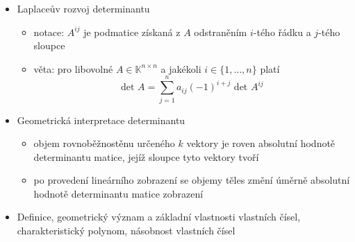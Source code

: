 \begin{itemize}
\begin{itemize}
\item determinant matice $A\in\mathbb K^{n\times n}$ je dán výrazem \[\text{det }A=\sum_{p\in S_n}\text{sgn}(p)\prod_{i=1}^na_{i,p(i)}\]
\item věta: $\forall A,B\in\mathbb K^{n\times n}:\text{det}(AB)=\text{det }A\cdot\text{det }B$
\item transpozice nemění determinant, $\mathrm{det}\,A=\mathrm{det}\,A^T$
\item matice je regulární, právě když má nenulový determinant
\item pro regulární matici $A$ platí $\mathrm{det}(A^{-1})=\mathrm{det}(A)^{-1}$
\item výpočet determinantu je nutné nastudovat
\begin{practicebox}
Vlastní výpočet determinantu (rozvoj, úprava na trojúhelníkový tvar) si natrénuj na příkladech.
\end{practicebox}
\item $\mathrm{det}(A)=\lambda_1\cdot\lambda_2\cdot\ldots\cdot\lambda_n$
\item $\lambda$ je vlastním číslem $A$, právě když $\mathrm{det}(A-\lambda I_n)=0$
\begin{itemize}
\item tedy právě když je kořenem charakteristického polynomu $p_A(t)=\mathrm{det}(A-tI_n)$
\end{itemize}
\end{itemize}
\item Laplaceův rozvoj determinantu
\begin{itemize}
\item notace: $A^{ij}$ je podmatice získaná z $A$ odstraněním $i$-tého řádku a $j$-tého sloupce
\item věta: pro libovolné $A\in\mathbb K^{n\times n}$ a jakékoli $i\in \lbrace 1,\dots,n\rbrace$ platí \[\text{det }A=\sum^n_{j=1}a_{ij}(-1)^{i+j}\text{ det }A^{ij}\]
\end{itemize}
\item Geometrická interpretace determinantu
\begin{itemize}
\item objem rovnoběžnostěnu určeného $k$ vektory je roven absolutní hodnotě determinantu matice, jejíž sloupce tyto vektory tvoří
\item po provedení lineárního zobrazení se objemy těles změní úměrně absolutní hodnotě determinantu matice zobrazení
\end{itemize}
\item Definice, geometrický význam a základní vlastnosti vlastních čísel, charakteristický polynom, násobnost vlastních čísel

\end{itemize}
